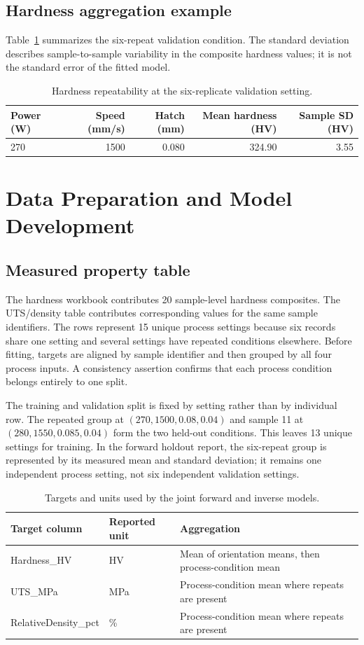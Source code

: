\documentclass[12pt,a4paper,oneside]{report}
\begin{document}
\section{Hardness aggregation example}
Table~\ref{tab:hardness-repeat-summary} summarizes the six-repeat validation condition. The standard deviation describes sample-to-sample variability in the composite hardness values; it is not the standard error of the fitted model.
\begin{table}[H]
\centering
\caption{Hardness repeatability at the six-replicate validation setting.}
\label{tab:hardness-repeat-summary}
\begin{tabular}{lrrrr}
\toprule
Power (W) & Speed (mm/s) & Hatch (mm) & Mean hardness (HV) & Sample SD (HV)\\
\midrule
270 & 1500 & 0.080 & 324.90 & 3.55\\
\bottomrule
\end{tabular}
\end{table}

\chapter{Data Preparation and Model Development}

\section{Measured property table}
The hardness workbook contributes 20 sample-level hardness composites. The UTS/density table contributes corresponding values for the same sample identifiers. The rows represent 15 unique process settings because six records share one setting and several settings have repeated conditions elsewhere. Before fitting, targets are aligned by sample identifier and then grouped by all four process inputs. A consistency assertion confirms that each process condition belongs entirely to one split.

The training and validation split is fixed by setting rather than by individual row. The repeated group at $(270,1500,0.08,0.04)$ and sample 11 at $(280,1550,0.085,0.04)$ form the two held-out conditions. This leaves 13 unique settings for training. In the forward holdout report, the six-repeat group is represented by its measured mean and standard deviation; it remains one independent process setting, not six independent validation settings.

\begin{table}[H]
\centering
\caption{Targets and units used by the joint forward and inverse models.}
\label{tab:targets}
\begin{tabular}{lll}
\toprule
Target column & Reported unit & Aggregation\\
\midrule
Hardness\_HV & HV & Mean of orientation means, then process-condition mean\\
UTS\_MPa & MPa & Process-condition mean where repeats are present\\
RelativeDensity\_pct & \% & Process-condition mean where repeats are present\\
\bottomrule
\end{tabular}
\end{table}
\end{document}
